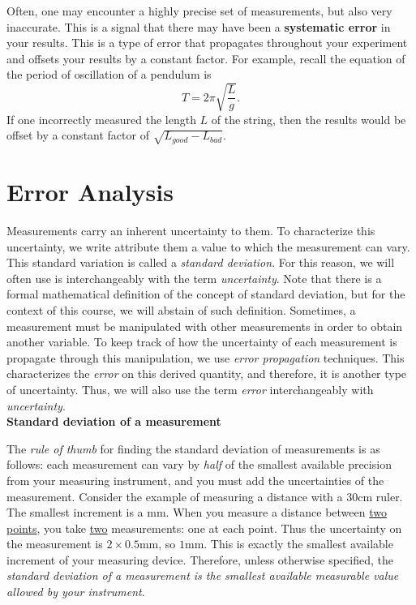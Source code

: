 \documentclass[12pt]{report}
\begin{document}
Often, one may encounter a highly precise set of measurements, but also very inaccurate. This is a signal that there may have been a \textbf{systematic error} in your results. This is a type of error that propagates throughout your experiment and offsets your results by a constant factor. For example, recall the equation of the period of oscillation of a pendulum is
\begin{equation}
T = 2 \pi \sqrt{\frac{L}{g}}.
\end{equation}
If one incorrectly measured the length $L$ of the string, then the results would be offset by a constant factor of $\sqrt{L_{good}- L_{bad}}$. \\

\section{Error Analysis} \label{Sec:ErrorAnalysis}

Measurements carry an inherent uncertainty to them.
To characterize this uncertainty, we write attribute them a value to which the measurement can vary. This standard variation is called a \textit{standard deviation}. For this reason, we will often use is interchangeably with the term \textit{uncertainty}. 
Note that there is a formal mathematical definition of the concept of standard deviation, but for the context of this course, we will abstain of such definition.
Sometimes, a measurement must be manipulated with other measurements in order to obtain another variable. To keep track of how the uncertainty of each measurement is propagate through this manipulation, we use \textit{error propagation} techniques. This characterizes the \textit{error} on this derived quantity, and therefore, it is another type of uncertainty.
Thus, we will also use the term \textit{error} interchangeably with \textit{uncertainty}.\\

\noindent \large \textbf{Standard deviation of a measurement} \normalsize

The \textit{rule of thumb} for finding the standard deviation of measurements is as follows: each measurement can vary by \textit{half} of the smallest available precision from your measuring instrument, and you must add the uncertainties of the measurement. Consider the example of measuring a distance with a 30cm ruler. The smallest increment is a mm. When you measure a distance between \underline{two points}, you take \underline{two} measurements: one at each point. Thus the uncertainty on the measurement is $2 \times 0.5$mm, so $1$mm. This is exactly the smallest available increment of your measuring device. Therefore, unless otherwise specified, the \textit{standard deviation of a measurement is the smallest available measurable value allowed by your instrument}. 
\end{document}
